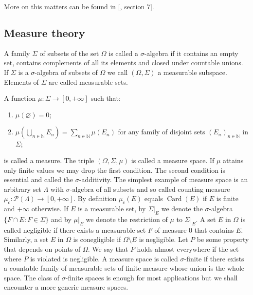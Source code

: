 More on this matters can be found in [\cite{BourbElemMathGenTopLivIII}, section
7].



\subsection{
  Measure theory
}\label{SubSectionMeasureTheory}

A family $\Sigma$ of subsets of the set $\Omega$ is called a $\sigma$-algebra if
it contains an empty set, contains complements of all its elements and closed
under countable unions. If $\Sigma$ is a $\sigma$-algebra of subsets of $\Omega$
we call $(\Omega,\Sigma)$ a measurable subspace. Elements of $\Sigma$ are called
measurable sets. 

A function $\mu:\Sigma\to[0,+\infty]$ such that:  
\begin{enumerate}[label = (\roman*)]
  \item $\mu(\varnothing)=0$; 

  \item $\mu\left(\bigcup\limits_{n\in\mathbb{N}} E_n\right)
  =\sum\limits_{n\in\mathbb{N}}\mu(E_n)$ for any family of disjoint sets
  ${(E_n)}_{n\in\mathbb{N}}$ in $\Sigma$; 
\end{enumerate}

is called a measure. The triple $(\Omega,\Sigma,\mu)$ is called a measure space.
If $\mu$ attains only finite values we may drop the first condition. The second
condition is essential and called the $\sigma$-additivity. The simplest example
of measure space is an  arbitrary set $\Lambda$ with $\sigma$-algebra of all
subsets and so called counting measure
$\mu_c:\mathcal{P}(\Lambda)\to[0,+\infty]$. By definition $\mu_c(E)$ equals
$\operatorname{Card}(E)$ if $E$ is finite and $+\infty$ otherwise. If $E$ is a
measurable set, by $\Sigma|_E$ we denote the $\sigma$-algebra $ \{F\cap
E:F\in\Sigma \}$ and by $\mu|_E$ we denote the restriction of $\mu$ to
$\Sigma|_E$. A set $E$ in $\Omega$ is called negligible if there exists a
measurable set $F$ of measure $0$ that contains $E$. Similarly, a set $E$ in
$\Omega$ is conegligible if $\Omega\setminus E$ is negligible. Let $P$ be some
property that depends on points of $\Omega$. We say that $P$ holds almost
everywhere if the set where $P$ is violated is negligible. A measure space is
called $\sigma$-finite if there exists a countable family of measurable sets of
finite measure whose union is the whole space. The class of $\sigma$-finite
spaces is enough for most applications but we shall encounter a more generic
measure spaces.

